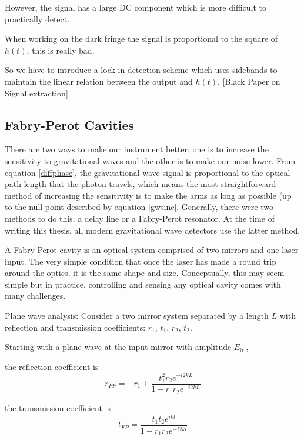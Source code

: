 \documentclass[oneside]{book}
\begin{document}
		However, the signal has a large DC component which is more difficult to practically detect.  
		
		When working on the dark fringe the signal is proportional to the square of $h(t)$, this is really bad.
		
		So we have to introduce a lock-in detection scheme which uses sidebands to maintain the linear relation between the output and $h(t)$.
		[Black Paper on Signal extraction]	
	
		\subsection{Fabry-Perot Cavities}\label{FP}
		There are two ways to make our instrument better: one is to increase the sensitivity to gravitational waves and the other is to make our noise lower. From equation \ref{diffphase}, the gravitational wave signal is proportional to the optical path length that the photon travels, which means the most straightforward method of increasing the sensitivity is to make the arms as long as possible (up to the null point described by equation \ref{gwsinc}.  Generally, there were two methods to do this: a delay line or a Fabry-Perot resonator.  At the time of writing this thesis, all modern gravitational wave detectors use the latter method.
	
		A Fabry-Perot cavity is an optical system comprised of two mirrors and one laser input. The very simple condition that once the laser has made a round trip around the optics, it is the same shape and size.  Conceptually, this may seem simple but in practice, controlling and sensing any optical cavity comes with many challenges.
		
		Plane wave analysis:
		Consider a two mirror system separated by a length $L$ with reflection and transmission coefficients: $r_1$, $t_1$, $r_2$, $t_2$.
		
		Starting with a plane wave at the input mirror with amplitude $E_0$ \cite{Saulson}, 
		
		the reflection coefficient is 
		\begin{equation}
		r_{FP} = -r_1 + \frac{t_1^2 r_2  e^{-i2kL}}{1-r_1 r_2 e^{-i2kL}}
		\end{equation}
		
		the transmission coefficient is
		\begin{equation}
		t_{FP} = \frac{t_1 t_2 e^{ikl}}{1-r_1 r_2 e^{-i2kl}}
		\end{equation}
		
\end{document}
